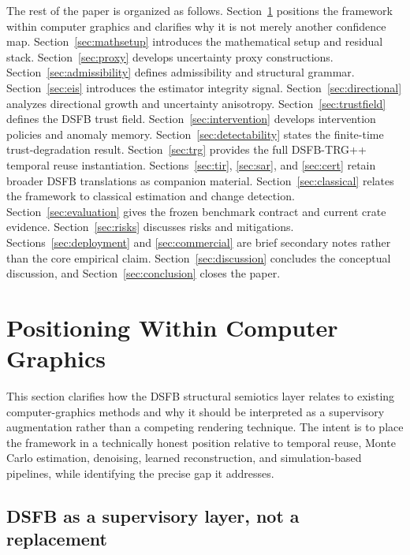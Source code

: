 \documentclass[11pt]{article}
\theoremstyle{definition}
\theoremstyle{plain}
\begin{document}
The rest of the paper is organized as follows. Section~\ref{sec:positioning} positions the framework within computer graphics and clarifies why it is not merely another confidence map. Section~\ref{sec:mathsetup} introduces the mathematical setup and residual stack. Section~\ref{sec:proxy} develops uncertainty proxy constructions. Section~\ref{sec:admissibility} defines admissibility and structural grammar. Section~\ref{sec:eis} introduces the estimator integrity signal. Section~\ref{sec:directional} analyzes directional growth and uncertainty anisotropy. Section~\ref{sec:trustfield} defines the DSFB trust field. Section~\ref{sec:intervention} develops intervention policies and anomaly memory. Section~\ref{sec:detectability} states the finite-time trust-degradation result. Section~\ref{sec:trg} provides the full DSFB-TRG++ temporal reuse instantiation. Sections~\ref{sec:tir}, \ref{sec:sar}, and \ref{sec:cert} retain broader DSFB translations as companion material. Section~\ref{sec:classical} relates the framework to classical estimation and change detection. Section~\ref{sec:evaluation} gives the frozen benchmark contract and current crate evidence. Section~\ref{sec:risks} discusses risks and mitigations. Sections~\ref{sec:deployment} and \ref{sec:commercial} are brief secondary notes rather than the core empirical claim. Section~\ref{sec:discussion} concludes the conceptual discussion, and Section~\ref{sec:conclusion} closes the paper.


\section{Positioning Within Computer Graphics}
\label{sec:positioning}

This section clarifies how the DSFB structural semiotics layer relates to existing computer-graphics methods and why it should be interpreted as a supervisory augmentation rather than a competing rendering technique. The intent is to place the framework in a technically honest position relative to temporal reuse, Monte Carlo estimation, denoising, learned reconstruction, and simulation-based pipelines, while identifying the precise gap it addresses.


\subsection{DSFB as a supervisory layer, not a replacement}
\end{document}
